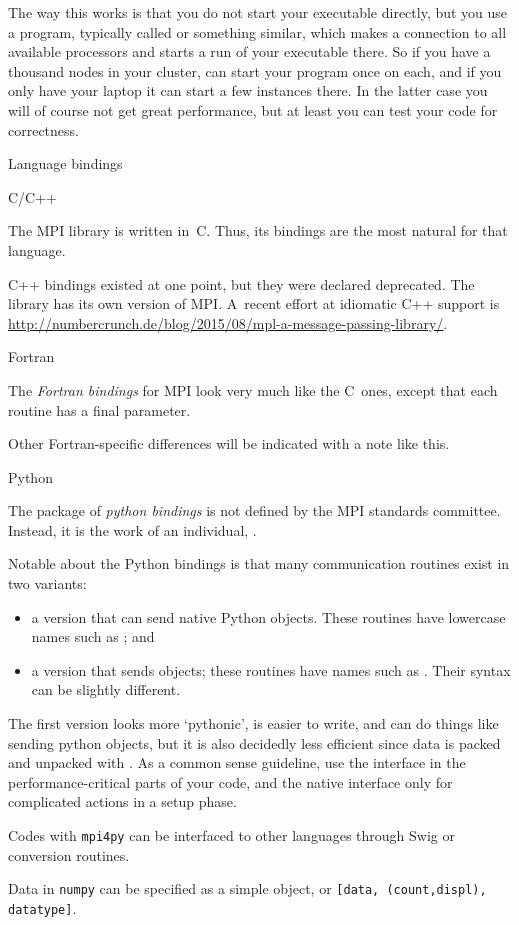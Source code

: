 The way this works is that you do not start your executable directly,
but you use a program, typically called  or
something similar, which makes a connection to all available
processors and starts a run of your executable there. So if you have a
thousand nodes in your cluster,  can start your program once
on each, and if you only have your laptop it can start a few instances
there. In the latter case you will of course not get great
performance, but at least you can test your code for correctness.

 {Language bindings}

 {C/C++}

The MPI library is written in~C. Thus, its bindings are the most natural
for that language.

C++ bindings existed at one point, but they were declared deprecated.
The  library has its own version of MPI.  A~recent
effort at idiomatic C++ support is 
\url{http://numbercrunch.de/blog/2015/08/mpl-a-message-passing-library/}.


 {Fortran}


The \emph{Fortran bindings} for MPI look very much like the C~ones, except that
each routine has a final  parameter.

\begin{fortrannote}
  Other Fortran-specific differences will be indicated with a note
  like this.
\end{fortrannote}


 {Python}


The  package of \emph{python bindings}
is not defined by the MPI
standards committee. Instead, it is the work of an individual,
.

Notable about the Python bindings is that many communication routines
exist in two variants:
\begin{itemize}
\item a version that can send native Python objects. These routines
  have lowercase names such as ; and
\item a version that sends  objects; these routines
  have names such as . Their syntax can be slightly different.
\end{itemize}
The first version looks more `pythonic', is easier to write,
and can do things like sending python objects,
but it is also decidedly less efficient since data is packed
and unpacked with . As a common sense guideline,
use the  interface in the performance-critical parts
of your code, and the native interface only for complicated
actions in a setup phase.

Codes with \texttt{mpi4py} can be interfaced to other languages
through Swig or conversion routines.

Data in \texttt{numpy} can be specified as a simple object,
or \texttt{[data, (count,displ), datatype]}.

